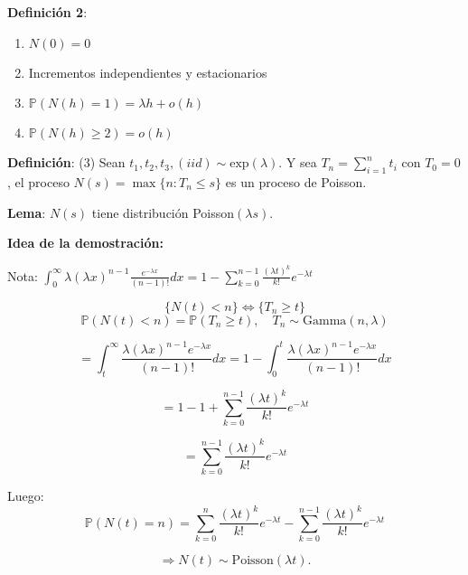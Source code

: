 \documentclass[12pt,a4paper]{article}
\newcommand{\definicion}[1]{%
\begin{definicionbox}
\textbf{Definición}: #1
\end{definicionbox}
}
\newcommand{\lema}[1]{%
\begin{lemabox}
\textbf{Lema}: #1
\end{lemabox}
}
\begin{document}
\textbf{Definición 2}:
\begin{enumerate}
    \item $N(0) = 0$
    \item Incrementos independientes y estacionarios
    \item $\mathbb{P}(N(h) = 1) = \lambda h + o(h)$
    \item $\mathbb{P}(N(h) \geq 2) = o(h)$
\end{enumerate}

\definicion{(3) Sean $t_1, t_2, t_3, (iid) \sim \text{exp}(\lambda)$. Y sea $T_n = \sum_{i=1}^{n} t_i$ con $T_0 = 0$, el proceso $N(s) = \max\{n : T_n \leq s\}$ es un proceso de Poisson.}


\lema{$N(s)$ tiene distribución Poisson$(\lambda s)$.}

\textbf{Idea de la demostración:}

Nota: $\int_0^{\infty} \lambda (\lambda x)^{n-1} \frac{e^{-\lambda x}}{(n-1)!} dx = 1 - \sum_{k=0}^{n-1} \frac{(\lambda t)^k}{k!} e^{-\lambda t}$

\begin{equation*}
\{N(t) < n\} \Leftrightarrow \{T_n \geq t\}
\end{equation*}
\begin{equation*}
\mathbb{P}(N(t) < n) = \mathbb{P}(T_n \geq t), \quad T_n \sim \text{Gamma}(n, \lambda)
\end{equation*}

\begin{equation*}
= \int_t^{\infty} \frac{\lambda (\lambda x)^{n-1} e^{-\lambda x}}{(n-1)!} dx = 1 - \int_0^t \frac{\lambda (\lambda x)^{n-1} e^{-\lambda x}}{(n-1)!} dx
\end{equation*}

\begin{equation*}
= 1 - 1 + \sum_{k=0}^{n-1} \frac{(\lambda t)^k}{k!} e^{-\lambda t}
\end{equation*}

\begin{equation*}
= \sum_{k=0}^{n-1} \frac{(\lambda t)^k}{k!} e^{-\lambda t}
\end{equation*}

Luego:
\begin{equation*}
\mathbb{P}(N(t) = n) = \sum_{k=0}^{n} \frac{(\lambda t)^k}{k!} e^{-\lambda t} - \sum_{k=0}^{n-1} \frac{(\lambda t)^k}{k!} e^{-\lambda t}
\end{equation*}

\begin{equation*}
\Rightarrow N(t) \sim \text{Poisson}(\lambda t).
\end{equation*}
\end{document}
